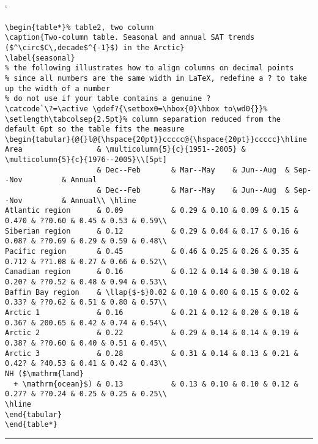 \documentclass[review,oneside]{igs}
\begin{document}
\begin{table*}
\catcode`%
\vspace{0.25\baselineskip}
\begin{verbatim}
\begin{table*}% table2, two column
\caption{Two-column table. Seasonal and annual SAT trends ($^\circ$C\,decade$^{-1}$) in the Arctic}
\label{seasonal}
% the following illustrates how to align columns on decimal points
% since all numbers are the same width in LaTeX, redefine a ? to take up the width of a number
% do not use if your table contains a genuine ?
\catcode`\?=\active \gdef?{\setbox0=\hbox{0}\hbox to\wd0{}}%
\setlength\tabcolsep{2.5pt}% column separation reduced from the default 6pt so the table fits the measure
\begin{tabular}{@{}l@{\hspace{20pt}}ccccc@{\hspace{20pt}}ccccc}\hline
Area                 & \multicolumn{5}{c}{1951--2005} & \multicolumn{5}{c}{1976--2005}\\[5pt]
                     & Dec--Feb       & Mar--May    & Jun--Aug  & Sep--Nov         & Annual
                     & Dec--Feb       & Mar--May    & Jun--Aug  & Sep--Nov         & Annual\\ \hline
Atlantic region      & 0.09           & 0.29 & 0.10 & 0.09 & 0.15 & 0.470 & ??0.60 & 0.45 & 0.53 & 0.59\\
Siberian region      & 0.12           & 0.29 & 0.04 & 0.17 & 0.16 & 0.08? & ??0.69 & 0.29 & 0.59 & 0.48\\
Pacific region       & 0.45           & 0.46 & 0.25 & 0.26 & 0.35 & 0.712 & ??1.08 & 0.27 & 0.66 & 0.52\\
Canadian region      & 0.16           & 0.12 & 0.14 & 0.30 & 0.18 & 0.20? & ??0.52 & 0.48 & 0.94 & 0.53\\
Baffin Bay region    & \llap{$-$}0.02 & 0.10 & 0.00 & 0.15 & 0.02 & 0.33? & ??0.62 & 0.51 & 0.80 & 0.57\\
Arctic 1             & 0.16           & 0.21 & 0.12 & 0.20 & 0.18 & 0.36? & 200.65 & 0.42 & 0.74 & 0.54\\
Arctic 2             & 0.22           & 0.29 & 0.14 & 0.14 & 0.19 & 0.38? & ??0.60 & 0.40 & 0.51 & 0.45\\
Arctic 3             & 0.28           & 0.31 & 0.14 & 0.13 & 0.21 & 0.42? & ?40.53 & 0.41 & 0.42 & 0.43\\
NH ($\mathrm{land}
  + \mathrm{ocean}$) & 0.13           & 0.13 & 0.10 & 0.10 & 0.12 & 0.27? & ??0.24 & 0.25 & 0.25 & 0.25\\
\hline
\end{tabular}
\end{table*}
\end{verbatim}
\vspace\baselineskip\hrule %
\end{table*}
\end{document}
